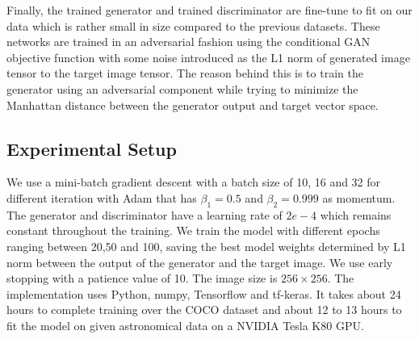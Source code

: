 \documentclass{article} %
\begin{document}
    \hspace*{0.167 in}Finally, the trained generator and trained discriminator are fine-tune to fit on our data which is rather small in size compared to the previous datasets. These networks are trained in an adversarial fashion using the conditional GAN objective function \citep{isola2018imagetoimage} with some noise introduced as the L1 norm of generated image tensor to the target image tensor. The reason behind this is to train the generator using an adversarial component while trying to minimize the Manhattan distance between the generator output and target vector space.
    \subsection{Experimental Setup}
    \hspace*{0.167 in}We use a mini-batch gradient descent with a batch size of 10, 16 and 32 for different iteration with Adam that has $\beta_1 = 0.5$ and $\beta_2 = 0.999$ as momentum. The generator and discriminator have a learning rate of $2e-4$ which remains constant throughout the training. We train the model with different epochs ranging between 20,50 and 100, saving the best model weights determined by L1 norm between the output of the generator and the target image. We use early stopping with a patience value of 10. The image size is $256\times256$. The implementation uses Python, numpy, Tensorflow and tf-keras. It takes about 24 hours to complete training over the COCO dataset and about 12 to 13 hours to fit the model on given astronomical data on a NVIDIA Tesla K80 GPU.
    
\end{document}
